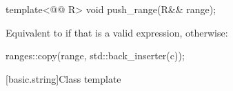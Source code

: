 \documentclass{wg21}
\begin{document}
\begin{addedblock}
\begin{itemdecl}
template<@@ R>
void push_range(R&& range);
\end{itemdecl}

\begin{itemdescr}
    \pnum
    \effects
    Equivalent to  if that is a valid expression,
    otherwise:
    \begin{codeblock}
        ranges::copy(range, std::back_inserter(c));
    \end{codeblock}
\end{itemdescr}
\end{addedblock}

[basic.string]{Class template }
\end{document}
